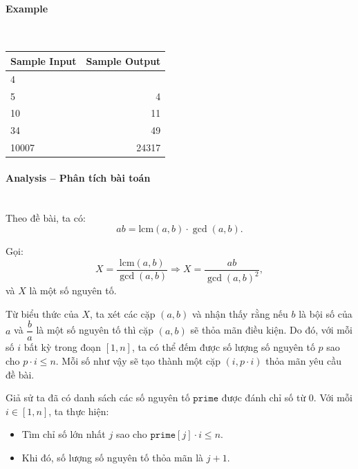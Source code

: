 \documentclass{article}
\begin{document}
\paragraph{Example}\mbox{} \\

\begin{table}[h]
    \centering
    \begin{tabular}{|l|r|}
        \hline
        \rowcolor{gray!30}
        \textbf{Sample Input} & \textbf{Sample Output} \\
        \hline
        4 & \\
        5 & 4 \\
        10 & 11 \\
        34 & 49 \\
        10007 & 24317 \\
        \hline
    \end{tabular}
\end{table}

\paragraph{Analysis -- Phân tích bài toán} \mbox{} \\
Theo đề bài, ta có:
\[
ab = \mathrm{lcm}(a, b) \cdot \gcd(a, b).
\]

Gọi:
\[
X = \frac{\mathrm{lcm}(a,b)}{\gcd(a,b)} \Rightarrow X = \frac{ab}{\gcd(a,b)^2},
\]
và $X$ là một số nguyên tố.

\bigskip

Từ biểu thức của $X$, ta xét các cặp $(a, b)$ và nhận thấy rằng nếu $b$ là bội số của $a$ và $\dfrac{b}{a}$ là một số nguyên tố thì cặp $(a, b)$ sẽ thỏa mãn điều kiện. Do đó, với mỗi số $i$ bất kỳ trong đoạn $[1, n]$, ta có thể đếm được số lượng số nguyên tố $p$ sao cho $p \cdot i \leq n$. Mỗi số như vậy sẽ tạo thành một cặp $(i, p \cdot i)$ thỏa mãn yêu cầu đề bài.

\bigskip

Giả sử ta đã có danh sách các số nguyên tố $\texttt{prime}$ được đánh chỉ số từ $0$. Với mỗi $i \in [1, n]$, ta thực hiện:

\begin{itemize}
    \item Tìm chỉ số lớn nhất $j$ sao cho $\texttt{prime}[j] \cdot i \leq n$.
    \item Khi đó, số lượng số nguyên tố thỏa mãn là $j + 1$.
\end{itemize}
\end{document}
